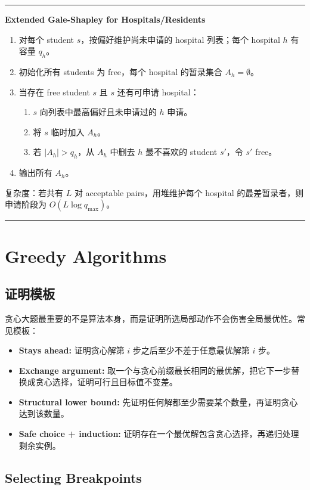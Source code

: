\documentclass[UTF8,a4paper,11pt]{ctexart}
\newenvironment{algobox}[1]
{\par\medskip\noindent\begin{minipage}{0.96\linewidth}\hrule\vspace{0.35em}\textbf{#1}\par\vspace{0.25em}\small}
{\par\vspace{0.25em}\hrule\end{minipage}\par\medskip}
\begin{document}
\begin{algobox}{Extended Gale-Shapley for Hospitals/Residents}
\begin{enumerate}
  \item 对每个 student $s$，按偏好维护尚未申请的 hospital 列表；每个 hospital $h$ 有容量 $q_h$。
  \item 初始化所有 students 为 free，每个 hospital 的暂录集合 $A_h=\emptyset$。
  \item 当存在 free student $s$ 且 $s$ 还有可申请 hospital：
  \begin{enumerate}
    \item $s$ 向列表中最高偏好且未申请过的 $h$ 申请。
    \item 将 $s$ 临时加入 $A_h$。
    \item 若 $|A_h|>q_h$，从 $A_h$ 中删去 $h$ 最不喜欢的 student $s'$，令 $s'$ free。
  \end{enumerate}
  \item 输出所有 $A_h$。
\end{enumerate}
复杂度：若共有 $L$ 对 acceptable pairs，用堆维护每个 hospital 的最差暂录者，则申请阶段为 $O(L\log q_{\max})$。
\end{algobox}

\section{Greedy Algorithms}

\subsection{证明模板}

贪心大题最重要的不是算法本身，而是证明所选局部动作不会伤害全局最优性。常见模板：
\begin{itemize}
  \item \textbf{Stays ahead:} 证明贪心解第 $i$ 步之后至少不差于任意最优解第 $i$ 步。
  \item \textbf{Exchange argument:} 取一个与贪心前缀最长相同的最优解，把它下一步替换成贪心选择，证明可行且目标值不变差。
  \item \textbf{Structural lower bound:} 先证明任何解都至少需要某个数量，再证明贪心达到该数量。
  \item \textbf{Safe choice + induction:} 证明存在一个最优解包含贪心选择，再递归处理剩余实例。
\end{itemize}

\subsection{Selecting Breakpoints}
\end{document}
